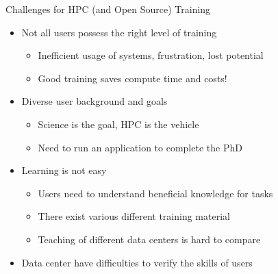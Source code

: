 \documentclass[compress,aspectratio=169]{beamer}
\begin{document}
\begin{frame}{Challenges for HPC (and Open Source) Training}
		\begin{itemize}
			\item Not all users possess the right level of training
				\begin{itemize}
				\item Inefficient usage of systems, frustration, lost potential
				\item Good training saves compute time and costs!
				\end{itemize}
      \item Diverse user background and goals
        \begin{itemize}
          \item Science is the goal, HPC is the vehicle
          \item Need to run an application to complete the PhD
        \end{itemize}
      \item Learning is not easy
			\begin{itemize}
				\item Users need to understand beneficial knowledge for tasks
				\item There exist various different training material
				\item Teaching of different data centers is hard to compare
			\end{itemize}
			\item Data center have difficulties to verify the skills of users
		\end{itemize}

\end{frame}
\end{document}
